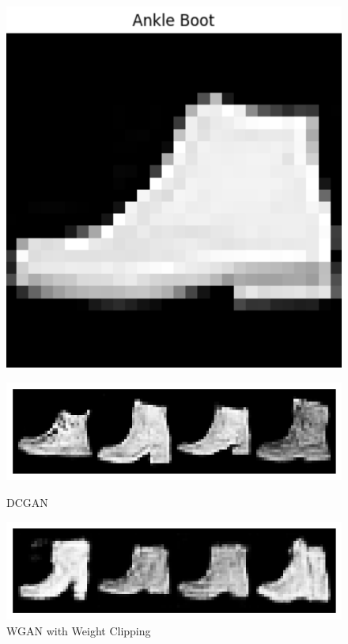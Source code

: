 \documentclass{article}
\begin{document}
\begin{figure}[ht]
{\begin{minipage}[t]{0.45\textwidth}
\begin{minipage}[b]{0.45\textwidth}
            \centering
            \includegraphics[width=\textwidth]{../src/real_boot2.png}
            \label{fig:image5}
        \end{minipage}
        \vfill
    \end{minipage}
    \hfill
    \begin{minipage}[t]{0.45\textwidth}
        \centering
        \includegraphics[width=\textwidth]{../src/dc_boot.png}
        \caption{DCGAN}
        \label{fig:image1}

        \includegraphics[width=\textwidth]{../src/wgan_boot.png}
        \caption{WGAN with Weight Clipping}
        \label{fig:image2}


\end{minipage}}
\end{figure}
\end{document}
